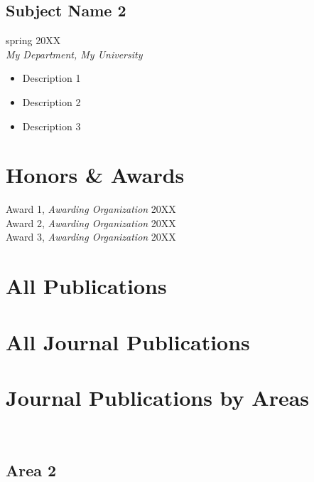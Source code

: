 	\subsection{Subject Name 2} \hfill spring 20XX\\
	\textsl{My Department, My University}
	\begin{itemize}
		\item Description 1
		\item Description 2
		\item Description 3
	\end{itemize}

	\section{Honors \& Awards} 
	Award 1, \textsl{Awarding Organization} \hfill 20XX\\
	Award 2, \textsl{Awarding Organization} \hfill 20XX\\
	Award 3, \textsl{Awarding Organization} \hfill 20XX\\

	\section{All Publications}  %
	\printbibliography

	\section{All Journal Publications}  %
	\printbibliography[type=article]

	\section{Journal Publications by Areas}  %
	\hfill\\
	\printbibliography[subtype=area1]

	\subsection{Area 2}\hfill\\
	\printbibliography[subtype=area2]

